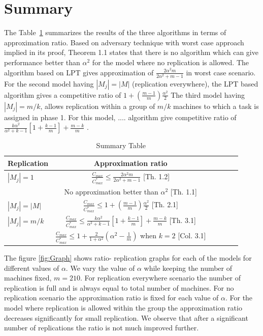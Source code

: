 \documentclass[10pt, conference, compsocconf]{IEEEtran}
\begin{document}
\section{Summary}
The Table~\ref{tab:template} summarizes the results of the three
algorithms in terms of approximation ratio. Based on
adversary technique with worst case approach implied
in its proof, Theorem 1.1 states that there is no algorithm
which can give performance better than $\alpha^2$ for the
model where no replication is allowed. The algorithm
based on LPT gives approximation of $\frac{2\alpha^{2}m}{2\alpha^{2}+ m-1}$ in worst case scenario. For the second model having
$|M_j| = |M|$ (replication everywhere), the LPT based
algorithm gives a competitive ratio of $1 + (\frac{m-1}{m})\frac{\alpha^{2}}{2}$
The third model having $|M_j| = m/k$, allows replication
within a group of $m/k$ machines to which a task is
assigned in phase 1. For this model, .... algorithm give
competitive ratio of $\frac{k\alpha^{2}}{\alpha^{2}+k-1}\left[1+ {\frac{k-1}{m}} \right]+ {\frac{m-k}{m}}$ .



\begin{table}[ht]
\centering
\begin{tabular}{|l|c|c|c|c|c|}
\hline
Replication & Approximation ratio  \\
\hline
$|M_j|=1$ & $\frac{C_{max}}{C_{max}^{*}}\leq \frac{2\alpha^{2}m}{2\alpha^{2}+ m-1}$ [Th. 1.2]  \\
 & No approximation better than $\alpha^2$ [Th. 1.1]   \\

\hline
$|M_j|=|M|$ & $\frac{C_{max}}{C_{max}^{*}} \leq 1 + (\frac{m-1}{m})\frac{\alpha^{2}}{2}$ [Th. 2.1]  \\

 \hline
 
 $|M_j|= m/k $ & $\frac{C_{max}}{C_{max}^{*}} \leq \frac{k\alpha^{2}}{\alpha^{2}+k-1}\left[1+ {\frac{k-1}{m}} \right]+ {\frac{m-k}{m}}$ [Th. 3.1]  \\
  & $\frac{C_{max}}{C_{max}^{*}} \leq  1+ \frac{2}{1+\alpha^{2}} \left(\alpha^2-\frac{1}{m}\right)$ when $k=2$ [Col. 3.1]   \\
  
  \hline
 \end{tabular}
\caption{Summary Table}
\label{tab:template}
\end{table}


The figure \ref{fig:Graph} shows ratio- replication graphs for each of the models for different values of $ \alpha$.  We vary the value of $\alpha$ while keeping the number of machines fixed, $m=210$. For replication everywhere scenario the number of replication is full and is always equal to total number of machines.  For no replication scenario the approximation ratio is fixed for each value of $\alpha$.  For the model where replication is allowed within the group the approximation ratio decreases significantly for small replication. We observe that after a significant number of replications the ratio is not much improved further. 
\end{document}
